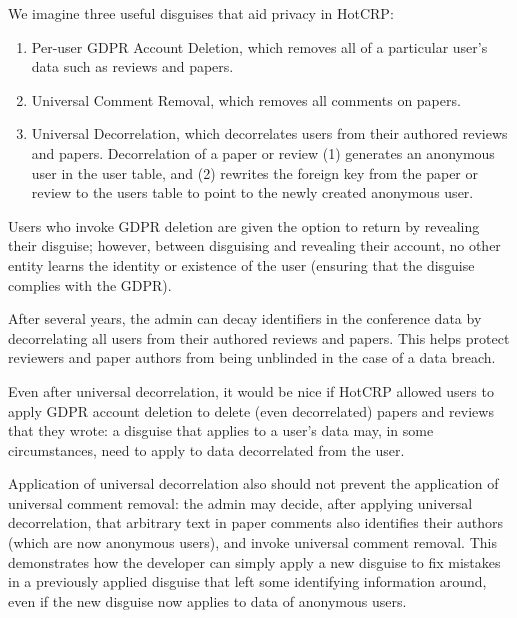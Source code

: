 We imagine three useful disguises that aid privacy in HotCRP: 
\begin{enumerate}
    \item Per-user GDPR Account Deletion, which
        removes all of a particular user's data such as reviews and papers.
    \item Universal Comment Removal, which removes all comments on papers.
    \item Universal Decorrelation, which decorrelates users from
        their authored reviews and papers. Decorrelation of a paper or review (1) generates an
        anonymous user in the user table, and (2) rewrites the foreign key from the paper or review
        to the users table to point to the newly created anonymous user.
\end{enumerate}

Users who invoke GDPR deletion are given the option to return by revealing their disguise; however,
between disguising and revealing their account, no other entity learns the identity or existence of
the user (ensuring that the disguise complies with the GDPR).

After several years, the admin can decay identifiers in the conference data by decorrelating all
users from their authored reviews and papers.  This helps protect reviewers and paper authors from
being unblinded in the case of a data breach.

Even after universal decorrelation, it would be nice if HotCRP allowed users to apply GDPR account
deletion to delete (even decorrelated) papers and reviews that they wrote: a disguise that applies
to a user's data may, in some circumstances, need to apply to data decorrelated from the user.

Application of universal decorrelation also should not prevent the application of universal comment
removal: the admin may decide, after applying universal decorrelation, that arbitrary text in paper
comments also identifies their authors (which are now anonymous users), and invoke universal comment
removal. 
%
This demonstrates how the developer can simply apply a new disguise to fix mistakes in a previously
applied disguise that left some identifying information around, even if the new disguise now applies to
data of anonymous users.

